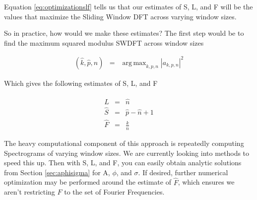 \documentclass[11pt]{article}
\theoremstyle{plain}
\theoremstyle{definition}
\DeclareMathOperator*{\argmax}{arg\,max}
\begin{document}
\noindent Equation \ref{eq:optimizationslf} tells us that our estimates of S, L, and F will be the values that maximize the Sliding Window DFT across varying window sizes.

So in practice, how would we make these estimates? The first step would be to find the maximum squared modulus SWDFT across window sizes

\begin{eqnarray}
\label{eq:maxswdftwindow}
	(\hat{k}, \hat{p}, \hat{n}) &=&\argmax_{k,p,n} |a_{k, p, n}|^2
\end{eqnarray}

\noindent Which gives the following estimates of S, L, and F

\begin{eqnarray}
	\hat{L} &=& \hat{n} \nonumber \\
	\hat{S} &=& \hat{p} - \hat{n} + 1 \nonumber \\
	\hat{F} &=& \frac{\hat{k}}{\hat{n}}
\end{eqnarray}

\noindent The heavy computational component of this approach is repeatedly computing Spectrograms of varying window sizes. We are currently looking into methods to speed this up. Then with S, L, and F, you can easily obtain analytic solutions from Section \ref{sec:aphisigma} for A, $\phi$, and $\sigma$. If desired, further numerical optimization may be performed around the estimate of $\hat{F}$, which ensures we aren't restricting $F$ to the set of Fourier Frequencies. 





\end{document}
